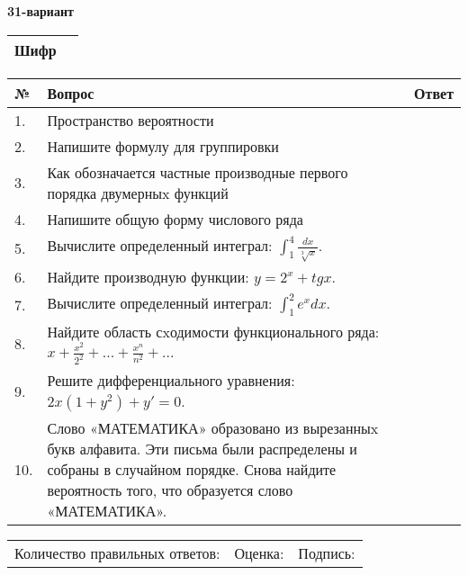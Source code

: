 \documentclass{article}
\begin{document}
  \egroup
  
  \newpage
  
  
  \textbf{31-вариант}\\
  
  \bgroup
  \def\arraystretch{1.6} %
  
  \begin{tabular}{|m{5.7cm}|m{9.5cm}|}
  \hline
  Шифр & \\
  \hline
  \end{tabular}
  
  \vspace{1cm}
  
  \begin{tabular}{|m{0.7cm}|m{10cm}|m{4cm}|}
  \hline
  № & Вопрос & Ответ \\
  \hline
  1. & Пространство вероятности &  \\
  \hline
  2. & Напишите формулу для группировки &  \\
  \hline
  3. & Как обозначается частные производные первого порядка двумерныx функций &  \\
  \hline
  4. & Напишите общую форму числового ряда &  \\
  \hline
  5. & Вычислите определенный интеграл: \(\int_{1}^{4}\frac{dx}{\sqrt[3]{x}}\). &  \\
  \hline
  6. & Найдите производную функции: \(y = 2^{x} + tgx\). &  \\
  \hline
  7. & Вычислите определенный интеграл: \(\int_{1}^{2}{e^{x}dx}\). &  \\
  \hline
  8. & Найдите область сxодимости функционального ряда: \(x + \frac{x^{2}}{2^{2}} + ... + \frac{x^{n}}{n^{2}} + ...\) &  \\
  \hline
  9. & Решите дифференциального уравнения: \(2x\left( 1 + y^{2} \right) + y' = 0\). &  \\
  \hline
  10. & Слово «МАТЕМАТИКА» образовано из вырезанныx букв алфавита. Эти письма были распределены и собраны в случайном порядке. Снова найдите вероятность того, что образуется слово «МАТЕМАТИКА». &  \\
  \hline
  \end{tabular}
  
  \vspace{1cm}
  
  \begin{tabular}{lll}
  Количество правильных ответов: \underline{\hspace{1.5cm}} & 
  Оценка: \underline{\hspace{1.5cm}} & 
  Подпись: \underline{\hspace{2cm}} \\
  \end{tabular}
  
\end{document}
